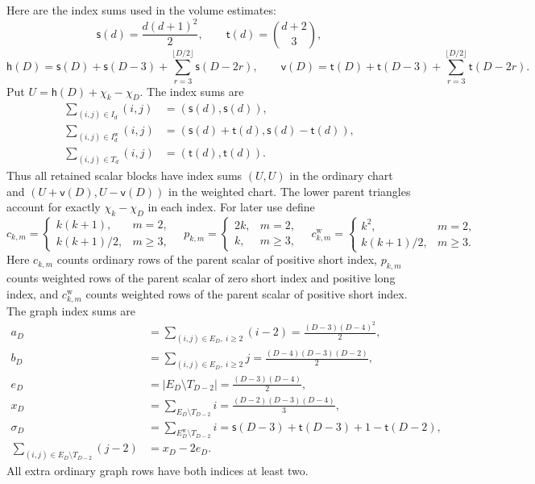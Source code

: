 \documentclass[11pt]{amsart}
\theoremstyle{definition}
\theoremstyle{remark}
\numberwithin{equation}{section}
\begin{document}
Here are the index sums used in the volume estimates:
\[
 \mathsf{s}(d)=\frac{d(d+1)^2}{2},\qquad \mathsf{t}(d)=\binom{d+2}{3},
\]
\[
 \mathsf{h}(D)=\mathsf{s}(D)+\mathsf{s}(D-3)+\sum_{r=3}^{\lfloor D/2\rfloor}\mathsf{s}(D-2r),\qquad \mathsf{v}(D)=\mathsf{t}(D)+\mathsf{t}(D-3)+\sum_{r=3}^{\lfloor D/2\rfloor}\mathsf{t}(D-2r).
\]
Put $U=\mathsf{h}(D)+\chi_k-\chi_D$. The index sums are
\[
\begin{aligned}
\sum_{(i,j)\in I_d}(i,j)&=(\mathsf{s}(d),\mathsf{s}(d)),\\
\sum_{(i,j)\in I_d^{\mathrm w}}(i,j)&=(\mathsf{s}(d)+\mathsf{t}(d),\mathsf{s}(d)-\mathsf{t}(d)),\\
\sum_{(i,j)\in T_d}(i,j)&=(\mathsf{t}(d),\mathsf{t}(d)).
\end{aligned}
\]
Thus all retained scalar blocks have index sums $(U,U)$ in the ordinary chart and $(U+\mathsf{v}(D),U-\mathsf{v}(D))$ in the weighted chart. The lower parent triangles account for exactly $\chi_k-\chi_D$ in each index. For later use define
\[
c_{k,m}=\begin{cases}k(k+1),&m=2,\\k(k+1)/2,&m\ge3,\end{cases}\quad p_{k,m}=\begin{cases}2k,&m=2,\\k,&m\ge3,\end{cases}\quad c_{k,m}^{\mathrm w}=\begin{cases}k^2,&m=2,\\k(k+1)/2,&m\ge3.\end{cases}
\]
Here $c_{k,m}$ counts ordinary rows of the parent scalar of positive short index, $p_{k,m}$ counts weighted rows of the parent scalar of zero short index and positive long index, and $c_{k,m}^{\mathrm w}$ counts weighted rows of the parent scalar of positive short index. The graph index sums are
\begin{align*}
a_D&=\sum_{(i,j)\in E_D,\ i\ge2}(i-2)=\frac{(D-3)(D-4)^2}{2},\\
b_D&=\sum_{(i,j)\in E_D,\ i\ge2}j=\frac{(D-4)(D-3)(D-2)}{2},\\
e_D&=|E_D\setminus T_{D-2}|=\frac{(D-3)(D-4)}2,\\
x_D&=\sum_{E_D\setminus T_{D-2}}i=\frac{(D-2)(D-3)(D-4)}3,\\
 \sigma_D&=\sum_{E_D^{\mathrm w}\setminus T_{D-2}}i=\mathsf{s}(D-3)+\mathsf{t}(D-3)+1-\mathsf{t}(D-2),\\
\sum_{(i,j)\in E_D\setminus T_{D-2}}(j-2)&=x_D-2e_D.
\end{align*}
All extra ordinary graph rows have both indices at least two.
\end{document}
